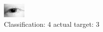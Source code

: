 \begin{figure}[h!]
\begin{center}
\includegraphics[width=0.60\columnwidth]{figures/ID12_class_4_target_3.png}
\end{center}
\caption{ Classification: 4 actual target: 3}
\label{fig:ID12_class_4_target_3}
\end{figure}
